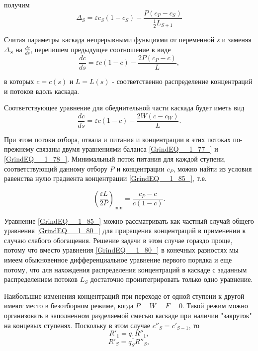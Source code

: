 получим
\begin{equation} \label{GrindEQ__1_84_} 
\Delta _{S} =\varepsilon c_{S} (1-c_{S} )-\frac{P(c_{P} -c_{S} )}{\frac{1}{2} L_{S+1} }  
\end{equation} 

Считая параметры каскада непрерывными функциями от переменной \textit{s} и заменяя $\Delta _{S} $ на $\frac{dc}{ds} $, перепишем предыдущее соотношение в виде
\begin{equation} \label{GrindEQ__1_85_} 
\frac{dc}{ds} =\varepsilon c(1-c)-\frac{2P(c_{P} -c)}{L} ,                    
\end{equation} 

в которых $c=c(s)$ и $L=L(s)$ - соответственно распределение концентраций и потоков вдоль каскада. 

Соответствующее уравнение для обеднительной части каскада будет иметь вид
\begin{equation} \label{GrindEQ__1_86_} 
\frac{dc}{ds} =\varepsilon c(1-c)-\frac{2W(c-c_{W} )}{L} .                     
\end{equation} 

При этом потоки отбора, отвала и питания и концентрации в этих потоках по-прежнему связаны двумя уравнениями баланса \ref{GrindEQ__1_77_} и \ref{GrindEQ__1_78_}. Минимальный поток питания для каждой ступени, соответствующий данному отбору \textit{P} и концентрации $c_{P} $, можно найти из условия равенства нулю градиента концентрации \ref{GrindEQ__1_85_}, т.е.

\begin{equation} \label{GrindEQ__1_87_} 
\left(\frac{\varepsilon L}{2P} \right)_{\min } =\frac{c_{P} -c}{c(1-c)} .                                   
\end{equation} 

Уравнение \ref{GrindEQ__1_85_} можно рассматривать как частный случай общего уравнения \ref{GrindEQ__1_80_} для приращения концентраций в применении к случаю слабого обогащения. Решение задачи в этом случае гораздо проще, потому что вместо уравнения \ref{GrindEQ__1_80_} в конечных разностях мы имеем обыкновенное дифференциальное уравнение первого порядка и еще потому, что для нахождения распределения концентраций в каскаде с заданным распределением потоков $L_{S} $ достаточно проинтегрировать только одно уравнение.

Наибольшие изменения концентраций при переходе от одной ступени к другой имеют место в безотборном режиме, когда $P=W=F=0$. Такой режим можно организовать в заполненном разделяемой смесью каскаде при наличии "закруток" на концевых ступенях. Поскольку в этом случае $c''_{S} =c'_{S-1} $, то
\begin{equation} \label{GrindEQ__1_88_} 
R'_{1} =q_{1} R''_{1} ,    
\end{equation} 
\begin{equation} \label{GrindEQ__1_89_} 
R'_{S} =q_{S} R''_{S} ,    
\end{equation} 

